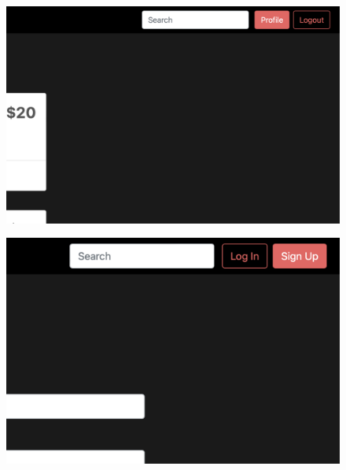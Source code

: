 \begin{figure}
\centering
\begin{minipage}{.5\textwidth}
  \centering
  \includegraphics[width=.8\linewidth]{images/Loggedin.png}
  \label{fig:test1}
\end{minipage}%
\begin{minipage}{.5\textwidth}
  \centering
  \includegraphics[width=.8\linewidth]{images/LoggedOut.png}
  \label{fig:test2}
\end{minipage}
\end{figure}

